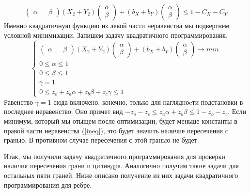 \documentclass[pdftex,ptm,12pt,a4paper]{report}
\begin{document}
      \begin{equation}\label{ineq}
            \begin{pmatrix} \alpha && \beta \end{pmatrix}
               (X_2 + Y_2)
             \begin{pmatrix} \alpha \\ \beta \end{pmatrix} +
             (b_X + b_Y) \begin{pmatrix} \alpha \\ \beta \end{pmatrix}  \le
             1 - C_X -C_Y
      \end{equation}
      Именно квадратичную функцию из левой части неравенства мы подвергнем условной минимизации.
      Запишем задачу квадратичного программирования.
      \begin{equation}\label{quadrtask}
          \begin{cases}
          \begin{pmatrix} \alpha && \beta \end{pmatrix}
               (X_2 + Y_2)
             \begin{pmatrix} \alpha \\ \beta \end{pmatrix} +
             (b_X + b_Y) \begin{pmatrix} \alpha \\ \beta \end{pmatrix} \to min \\
              0 \le  \alpha   \le  1 \\
              0 \le  \beta   \le  1 \\
              \gamma   =  1 \\
              0 \le  z_o + z_a \alpha + z_b \beta + z_c\gamma   \le  1
          \end{cases}
      \end{equation}
      Равенство $\gamma = 1$ сюда включено, конечно, только для наглядноcти подстановки в последнее неравенство.
      Оно примет вид $ -z_o - z_c \le  z_a \alpha + z_b \beta \le  1 -z_o - z_c$.
      Если минимум, который мы отыщем после оптимизации, будет меньше константы в правой части неравенства (\ref{ineq}), это будет значить наличие пересечения с гранью.
      В противном случае пересечения с этой гранью не будет.

      Итак, мы получили задачу квадратичного программирования для проверки наличия пересечения грани и цилиндра.
      Аналогично получим такие задачи для остальных пяти граней.
      Ниже описано получение из них задачи квадратичного программирования для ребре.
\end{document}
